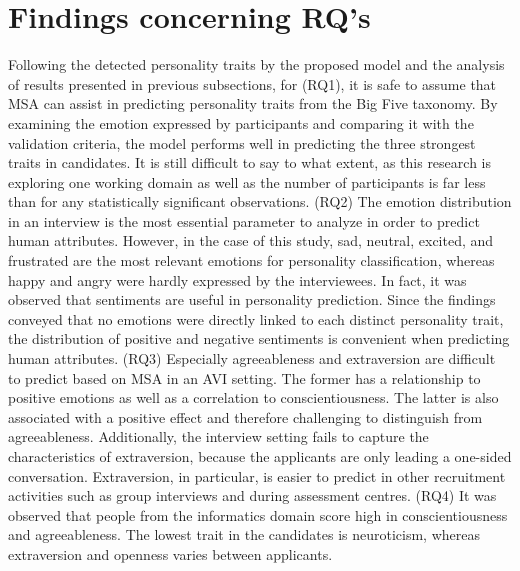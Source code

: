 \section{Findings concerning RQ's}
Following the detected personality traits by the proposed model and the analysis of results presented in previous subsections, for (RQ1), it is safe to assume that MSA can assist in predicting personality traits from the Big Five taxonomy. By examining the emotion expressed by participants and comparing it with the validation criteria, the model performs well in predicting the three strongest traits in candidates. It is still difficult to say to what extent, as this research is exploring one working domain as well as the number of participants is far less than for any statistically significant observations. (RQ2) The emotion distribution in an interview is the most essential parameter to analyze in order to predict human attributes. However, in the case of this study, sad, neutral, excited, and frustrated are the most relevant emotions for personality classification, whereas happy and angry were hardly expressed by the interviewees. In fact, it was observed that sentiments are useful in personality prediction. Since the findings conveyed that no emotions were directly linked to each distinct personality trait, the distribution of positive and negative sentiments is convenient when predicting human attributes. (RQ3) Especially agreeableness and extraversion are difficult to predict based on MSA in an AVI setting. The former has a relationship to positive emotions as well as a correlation to conscientiousness. The latter is also associated with a positive effect and therefore challenging to distinguish from agreeableness. Additionally, the interview setting fails to capture the characteristics of extraversion, because the applicants are only leading a one-sided conversation. Extraversion, in particular, is easier to predict in other recruitment activities such as group interviews and during assessment centres. (RQ4) It was observed that people from the informatics domain score high in conscientiousness and agreeableness. The lowest trait in the candidates is neuroticism, whereas extraversion and openness varies between applicants. 

